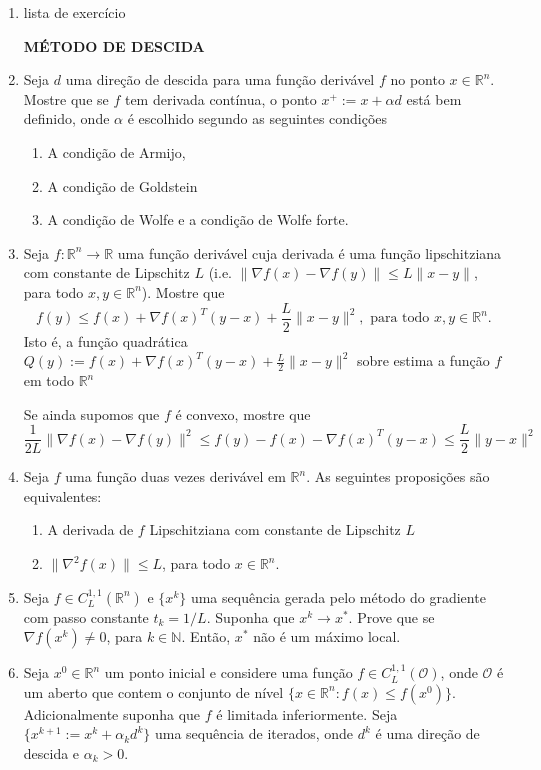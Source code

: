 \documentclass[a4paper,latin]{article}
\begin{document}
    \begin{enumerate}
    
    \item lista de exercício
    	
    {\bf MÉTODO DE DESCIDA }
    	
    \item Seja $d$ uma direção de descida para uma função derivável $f$
    no ponto $x \in \mathbb{R}^{n}$. 
    Mostre que se $f$ tem derivada contínua, o ponto $x^{+}:=x+\alpha d$ está bem definido, onde $\alpha$ é escolhido 
    segundo as seguintes condições 
    \begin{enumerate}
    	\item A condição de Armijo, 
    	\item A condição de Goldstein
    	\item A condição de Wolfe e a condição de Wolfe forte.
    \end{enumerate}	
     \item Seja $f:\mathbb{R}^{n}\rightarrow \mathbb{R}$ uma função derivável cuja derivada é uma função lipschitziana com constante de Lipschitz $L$ 
    (i.e. $\|\nabla f(x)-\nabla f(y)\|\leq L\|x-y\|$, para todo $x,y \in \mathbb{R}^{n}$).
    Mostre que
    $$ f(y)\leq f(x)+\nabla f(x)^{T}(y-x)+\frac{L}{2}\|x-y\|^{2}, \text{ para todo }x, y \in \mathbb{R}^{n}.$$    
    Isto é, a função quadrática 
    $Q(y):=f(x)+\nabla f(x)^{T}(y-x)+\frac{L}{2}\|x-y\|^{2}$
    sobre estima a função $f$ em todo $\mathbb{R}^{n}$
    
    Se ainda supomos que $f$ é convexo, mostre que  
    $$ \frac{1}{2L}
    \|\nabla f(x)-\nabla f(y)\|^{2}\leq
    f(y)-f(x)-\nabla f(x)^{T}(y-x)
    \leq 
    \frac{L}{2}
    \|y-x\|^2 $$     
    \item 
    Seja $f$ uma função duas vezes derivável em $\mathbb{R}^{n}$.
    As seguintes proposições são equivalentes:
    \begin{enumerate}
    	\item  A derivada 
    	de $f$ Lipschitziana 
    	com constante de Lipschitz $L$
    	\item $\|\nabla^{2} f(x)\|\leq L$,    para todo $x \in \mathbb{R}^{n}$.
    \end{enumerate} 
    \item 
    Seja $f \in C^{1,1}_{L}(\mathbb{R}^{n})$ e $\{x^{k}\}$ uma sequência gerada pelo método do gradiente com passo constante $t_{k}=1/L$.
    Suponha que $x^{k}\rightarrow x^{*}$.
    Prove que se $\nabla f(x^{k})\neq 0$, para $k \in \mathbb{N}$. Então, $x^*$ não é um
    máximo local.  
    \item Seja $x^{0} \in \mathbb{R}^{n}$ um ponto inicial e considere uma função $f \in C^{1,1}_{L}(\mathcal{O})$, onde 
    $\mathcal{O}$ é um aberto que contem o conjunto de nível 
    $ \{x \in \mathbb{R}^{n}: f(x)\leq f(x^0)\}$. Adicionalmente suponha que $f$ é limitada inferiormente.
    Seja $\{x^{k+1}:=x^{k}+\alpha_{k}d^{k}\}$
    uma sequência de iterados, onde 
    $d^{k}$ é uma direção de descida e $\alpha_{k}>0$.
    

\end{enumerate}
\end{document}
